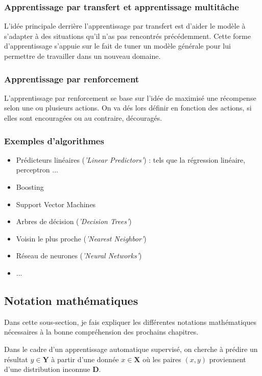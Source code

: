 \documentclass[a4paper]{article}
\begin{document}
\subsubsection{Apprentissage par transfert et apprentissage multitâche}
L'idée principale derrière l'apprentissage par transfert est d'aider le modèle à s'adapter à des situations qu'il n'as pas rencontrés précédemment. Cette forme d'apprentissage s'appuie sur le fait de tuner un modèle générale pour lui permettre de travailler dans un nouveau domaine.

\newpage

\subsubsection{Apprentissage par renforcement}
L'apprentissage par renforcement se base sur l'idée de maximisé une récompense selon une ou plusieurs actions. On va dés lors définir en fonction des actions, si elles sont encouragées ou au contraire, découragés.

\subsubsection{Exemples d'algorithmes}

\begin{itemize}
	\item Prédicteurs linéaires (\textit{'Linear Predictors'}) : tels que la régression linéaire, perceptron ...
	\item Boosting
	\item Support Vector Machines
	\item Arbres de décision (\textit{'Decision Trees'})
	\item Voisin le plus proche (\textit{'Nearest Neighbor'})
	\item Réseau de neurones (\textit{'Neural Networks'})
	\item ...
\end{itemize}

\newpage

\subsection{Notation mathématiques}
Dans cette sous-section, je fais expliquer les différentes notations mathématiques nécessaires à la bonne compréhension des prochains chapitres. \newline

Dans le cadre d'un apprentissage automatique supervisé, on cherche à prédire un résultat $y\in \bm{Y}$ à partir d'une donnée $x \in \bm{X}$ où les paires $(x,y)$ proviennent d'une distribution inconnue $\bm{D}$. \newline
\end{document}
